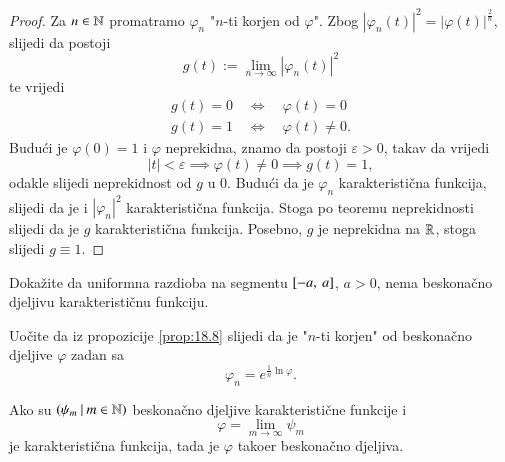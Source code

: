 \begin{proof}
    Za $n \in \mathbb{N}$ promatramo $\varphi_n$ "$n$-ti korjen od $\varphi$".
    Zbog $|\varphi_n (t)|^2 = |\varphi (t)|^\frac{2}{n}$, slijedi da postoji
    \begin{equation*}
        g (t) := \lim\limits_{n \to \infty} |\varphi_n (t)|^2
    \end{equation*}
    te vrijedi
    \begin{equation*}
        \begin{gathered}
            g (t) = 0 \quad \iff \quad \varphi (t) = 0\\
            g (t) = 1 \quad \iff \quad \varphi (t) \neq 0. 
        \end{gathered}
    \end{equation*}
    Budu\' ci je $\varphi (0) = 1$ i $\varphi$ neprekidna, znamo da postoji $\varepsilon > 0$, takav da vrijedi
    \begin{equation*}
        |t| < \varepsilon \implies \varphi (t) \neq 0 \implies g (t) = 1,
    \end{equation*}
    odakle slijedi neprekidnost od $g$ u $0$.
    Budu\' ci da je $\varphi_n$ karakteristi\v cna funkcija, slijedi da je i $|\varphi_n|^2$ karakteristi\v cna funkcija.
    Stoga po teoremu neprekidnosti slijedi da je $g$ karakteristi\v cna funkcija.
    Posebno, $g$ je neprekidna na $\mathbb{R}$, stoga slijedi $g \equiv 1$.
\end{proof}

\begin{zad} \label{zad:18.9}
    Doka\v zite da uniformna razdioba na segmentu $[{-a}, \:{a}]$, $a > 0$, nema beskona\v cno djeljivu karakteristi\v cnu funkciju.
\end{zad}

Uo\v cite da iz propozicije \ref{prop:18.8} slijedi da je "$n$-ti korjen" od beskona\v cno djeljive $\varphi$ zadan sa
\begin{equation}    \label{jed:18.10}
    \varphi_n = e^{\frac{1}{n} \ln \varphi}.
\end{equation}

\begin{prop}    \label{prop: 18.11}
    Ako su $({\psi_m} \: | \: {m \in \mathbb{N}})$ beskona\v cno djeljive karakteristi\v cne funkcije i
    \begin{equation*}
        \varphi = \lim\limits_{m \to \infty} \psi_m
    \end{equation*}
    je karakteristi\v cna funkcija, tada je $\varphi$ tako\dj er beskona\v cno djeljiva.
\end{prop}


